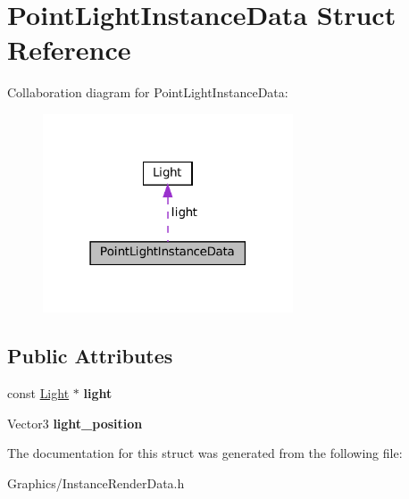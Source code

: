 \hypertarget{structPointLightInstanceData}{}\section{Point\+Light\+Instance\+Data Struct Reference}
\label{structPointLightInstanceData}


Collaboration diagram for Point\+Light\+Instance\+Data\+:\nopagebreak
\begin{figure}[H]
\begin{center}
\leavevmode
\includegraphics[width=210pt]{structPointLightInstanceData__coll__graph}
\end{center}
\end{figure}
\subsection*{Public Attributes}
\begin{DoxyCompactItemize}
\item 
\mbox{\label{structPointLightInstanceData_a7f8ee6a724a8176fe6f4a97b574209e1}} 
const \hyperlink{classLight}{Light} $\ast$ {\bfseries light}
\item 
\mbox{\label{structPointLightInstanceData_a3e21b970c557472fb2872ec3cda918b3}} 
Vector3 {\bfseries light\+\_\+position}
\end{DoxyCompactItemize}


The documentation for this struct was generated from the following file\+:\begin{DoxyCompactItemize}
\item 
Graphics/Instance\+Render\+Data.\+h\end{DoxyCompactItemize}
